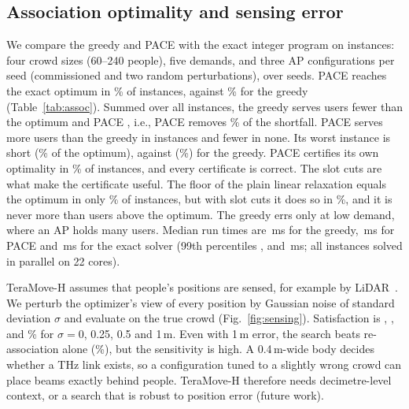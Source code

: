 \documentclass[conference]{IEEEtran}
\begin{document}
\subsection{Association optimality and sensing error}\label{sec:assoc}
We compare the greedy and PACE with the exact integer program on \AssocInstances{} instances: four crowd sizes (60--240 people), five demands, and three AP configurations per seed (commissioned and two random perturbations), over \MainSeeds{} seeds.
PACE reaches the exact optimum in \AssocPaceOptimalPct\% of instances, against \AssocOptimalPct\% for the greedy (Table~\ref{tab:assoc}).
Summed over all instances, the greedy serves \AssocShortGreedy{} users fewer than the optimum and PACE \AssocShortPace, i.e., PACE removes \AssocShortReduction\% of the shortfall.
PACE serves more users than the greedy in \AssocWins{} instances and fewer in none.
Its worst instance is \AssocPaceMaxGapText{} short (\AssocPaceWorstRatio\% of the optimum), against \AssocMaxGapText{} (\AssocWorstRatio\%) for the greedy.
PACE certifies its own optimality in \AssocCertPct\% of instances, and every certificate is correct.
The slot cuts are what make the certificate useful.
The floor of the plain linear relaxation equals the optimum in only \AssocLpTightPct\% of instances, but with slot cuts it does so in \AssocLpSlotTightPct\%, and it is never more than \AssocLpSlotMaxGap{} users above the optimum.
The greedy errs only at low demand, where an AP holds many users.
Median run times are \AssocTGreedy\,ms for the greedy, \AssocTPace\,ms for PACE and \AssocTExact\,ms for the exact solver (99th percentiles \AssocTGreedyPnn, \AssocTPacePnn{} and \AssocTExactPnn\,ms; all instances solved in parallel on 22 cores).

\begin{table}[t]
\centering
\caption{Association versus the exact optimum (\AssocPerDemand{} instances per demand)}\label{tab:assoc}
\footnotesize
\setlength{\tabcolsep}{3pt}

\end{table}

\begin{table}[t]
\centering
\caption{TeraMove-H with PACE / with greedy association (mean over crowd sizes and seeds)}\label{tab:pace}
\footnotesize
\setlength{\tabcolsep}{2pt}

\end{table}

TeraMove-H assumes that people's positions are sensed, for example by LiDAR~\cite{anon2026teramove}.
We perturb the optimizer's view of every position by Gaussian noise of standard deviation $\sigma$ and evaluate on the true crowd (Fig.~\ref{fig:sensing}).
Satisfaction is \SensZero, \SensQuarter, \SensHalf{} and \SensOne\% for $\sigma=0$, 0.25, 0.5 and 1\,m.
Even with 1\,m error, the search beats re-association alone (\PropTzero\%), but the sensitivity is high.
A 0.4\,m-wide body decides whether a THz link exists, so a configuration tuned to a slightly wrong crowd can place beams exactly behind people.
TeraMove-H therefore needs decimetre-level context, or a search that is robust to position error (future work).
\end{document}
